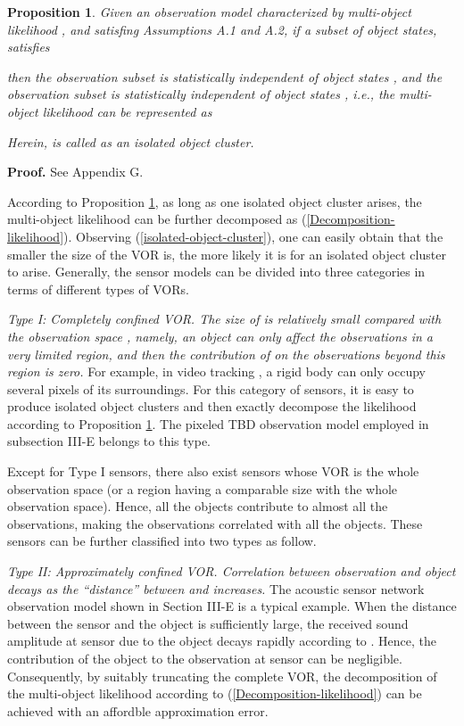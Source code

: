\documentclass[journal]{IEEEtran}
\newtheorem{Pro}{Proposition}
\newcommand{\proproof}[1]{\noindent\textbf{Proof. } See Appendix #1.}
\begin{document}
{\begin{Pro}\label{pro:7}
Given an observation model characterized by multi-object likelihood ,  and satisfing Assumptions A.1 and A.2, if a subset of object states,   satisfies 

 then the observation subset  is statistically independent of  object states , and the observation subset  is statistically independent of  object states , i.e., the multi-object likelihood can be represented as
 
Herein,  is called as an  isolated object cluster. 
\end{Pro}
\proproof{G}


According to Proposition \ref{pro:7},  as long as  one isolated object cluster arises,  the multi-object likelihood can be further  decomposed as (\ref{Decomposition-likelihood}). Observing (\ref{isolated-object-cluster}), one can easily obtain that the smaller the size of the VOR  is, the more likely it is  for an isolated object cluster to arise. Generally, the sensor models can be divided into three categories in terms of different types of VORs. 
 

 \textit{Type I: Completely confined VOR. The size of   is relatively small compared with the observation space , namely,  an object  can only affect  the observations in a  very limited region,  and then the  contribution of  on the observations beyond this region is zero. } For example, in video tracking \cite{refr:MeMber_filter,refr:computer-vision,refr:vedio-tracking}, a  rigid body   can only occupy several  pixels of its surroundings. For this category of sensors, it is easy to produce  isolated object clusters  and then exactly decompose the likelihood according to Proposition \ref{pro:7}. The pixeled TBD observation model employed in subsection III-E belongs to this type.




Except for Type I sensors, there also exist sensors  whose VOR is  the whole observation space (or a region having a comparable  size with the whole observation space). Hence,  all the objects   contribute to almost all  the observations, making the  observations correlated with all the objects. These sensors    can be further classified into two types as follow.

 \textit{Type II: Approximately confined VOR. Correlation between  observation  and  object  decays as the ``distance'' between  and  increases. } The acoustic sensor network  observation model \cite{refr:amplitude} shown in Section III-E is a typical example. When the distance  between the sensor  and the object   is sufficiently large, the received sound amplitude  at sensor  due to the object  decays rapidly according to . Hence, the contribution of  the object  to the observation  at sensor  can be negligible. Consequently,   by suitably truncating the complete VOR,  the decomposition of the multi-object likelihood according to (\ref{Decomposition-likelihood}) can be achieved with an affordble approximation error. 

}
\end{document}
